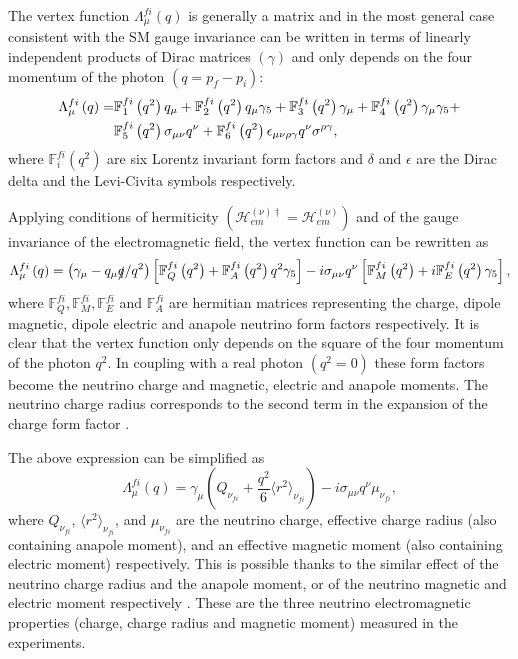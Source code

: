 The vertex function $\Lambda^{fi}_{\mu}\left(q\right)$ is generally a matrix and in the most general case consistent with the \gls{SM} gauge invariance \cite{MostGeneralNuElmagVectorFunctionExpressionKayser.pdf, MostGeneralNuElmagVectorFunctionExpressionNieves.pdf} can be written in terms of linearly independent products of Dirac matrices $\left(\gamma\right)$ and only depends on the four momentum of the photon $\left(q=p_f-p_i\right)$:
\begin{align}
\Lambda^{fi}_{\mu}\left(q\right)=&
\mathbb{F}^{fi}_1\left(q^2\right)q_{\mu}+
\mathbb{F}^{fi}_2\left(q^2\right)q_{\mu}\gamma_5+
\mathbb{F}^{fi}_3\left(q^2\right)\gamma_{\mu}+
\mathbb{F}^{fi}_4\left(q^2\right)\gamma_{\mu}\gamma_5+\notag\\ &
\mathbb{F}^{fi}_5\left(q^2\right)\sigma_{\mu\nu}q^{\nu}+
\mathbb{F}^{fi}_6\left(q^2\right)\epsilon_{\mu\nu\rho\gamma}q^{\nu}\sigma^{\rho\gamma},
\end{align}
where $\mathbb{F}^{fi}_i\left(q^2\right)$ are six Lorentz invariant form factors and $\delta$ and $\epsilon$ are the Dirac delta and the Levi-Civita symbols respectively.

Applying conditions of hermiticity $\left(\mathcal{H}^{\left(\nu\right)\dagger}_{em}=\mathcal{H}^{\left(\nu\right)}_{em}\right)$ and of the gauge invariance of the electromagnetic field, the vertex function can be rewritten as
\begin{equation}
\Lambda^{fi}_{\mu}\left(q\right)=
\left(\gamma_{\mu}-q_{\mu}\slashed{q}/q^2\right)\left[
\mathbb{F}^{fi}_{Q}\left(q^2\right)+\mathbb{F}^{fi}_{A}\left(q^2\right)q^2\gamma_5\right]-
i\sigma_{\mu\nu}q^{\nu}\left[\mathbb{F}^{fi}_{M}\left(q^2\right)+i\mathbb{F}^{fi}_{E}\left(q^2\right)\gamma_5\right],
\end{equation}
where $\mathbb{F}^{fi}_Q,\mathbb{F}^{fi}_M,\mathbb{F}^{fi}_E$ and $\mathbb{F}^{fi}_A$ are hermitian matrices representing the charge, dipole magnetic, dipole electric and anapole neutrino form factors respectively. It is clear that the vertex function only depends on the square of the four momentum of the photon $q^2$. In coupling with a real photon $\left(q^2=0\right)$ these form factors become the neutrino charge and magnetic, electric and anapole moments. The neutrino charge radius corresponds to the second term in the expansion of the charge form factor \cite{nuElmagInt2015.pdf}.

The above expression can be simplified as \cite{NeutrinoPropertiesSnowmass2022.pdf}
\begin{equation}
\Lambda^{fi}_{\mu}\left(q\right)=\gamma_{\mu}\left(Q_{\nu_{fi}}+\frac{q^2}{6}\langle r^2\rangle_{\nu_{fi}}\right)-i\sigma_{\mu\nu}q^{\nu}\mu_{\nu_{fi}},
\end{equation}
where $Q_{\nu_{fi}}$, $\langle r^2\rangle_{\nu_{fi}}$, and $\mu_{\nu_{fi}}$ are the neutrino charge, effective charge radius (also containing anapole moment), and an effective magnetic moment (also containing electric moment) respectively. This is possible thanks to the similar effect of the neutrino charge radius and the anapole moment, or of the neutrino magnetic and electric moment respectively \cite{nuElmagInt2015.pdf}. These are the three neutrino electromagnetic properties (charge, charge radius and magnetic moment) measured in the experiments.

